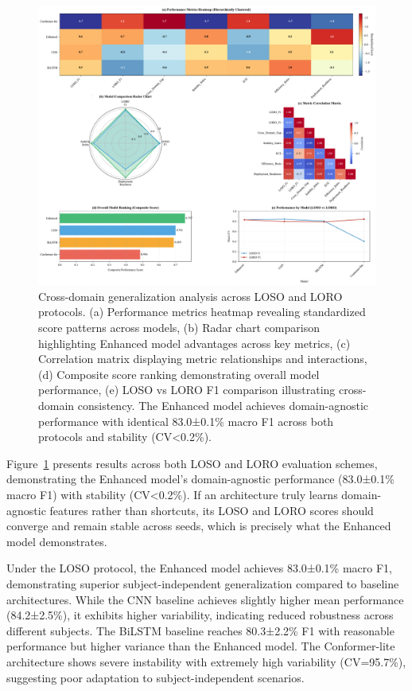 \documentclass[journal]{IEEEtran}
\begin{document}
\begin{figure}[ht]
\centering
\includegraphics[width=\linewidth]{plots/fig5_cross_domain.pdf}
\caption{Cross-domain generalization analysis across LOSO and LORO protocols. (a) Performance metrics heatmap revealing standardized score patterns across models, (b) Radar chart comparison highlighting Enhanced model advantages across key metrics, (c) Correlation matrix displaying metric relationships and interactions, (d) Composite score ranking demonstrating overall model performance, (e) LOSO vs LORO F1 comparison illustrating cross-domain consistency. The Enhanced model achieves domain-agnostic performance with identical 83.0±0.1\% macro F1 across both protocols and stability (CV<0.2\%).}
\label{fig:cross_domain}
\end{figure}

Figure~\ref{fig:cross_domain} presents results across both LOSO and LORO evaluation schemes, demonstrating the Enhanced model's domain-agnostic performance (83.0±0.1\% macro F1) with stability (CV<0.2\%). If an architecture truly learns domain-agnostic features rather than shortcuts, its LOSO and LORO scores should converge and remain stable across seeds, which is precisely what the Enhanced model demonstrates.

Under the LOSO protocol, the Enhanced model achieves 83.0±0.1\% macro F1, demonstrating superior subject-independent generalization compared to baseline architectures. While the CNN baseline achieves slightly higher mean performance (84.2±2.5\%), it exhibits higher variability, indicating reduced robustness across different subjects. The BiLSTM baseline reaches 80.3±2.2\% F1 with reasonable performance but higher variance than the Enhanced model. The Conformer-lite architecture shows severe instability with extremely high variability (CV=95.7\%), suggesting poor adaptation to subject-independent scenarios.
\end{document}
